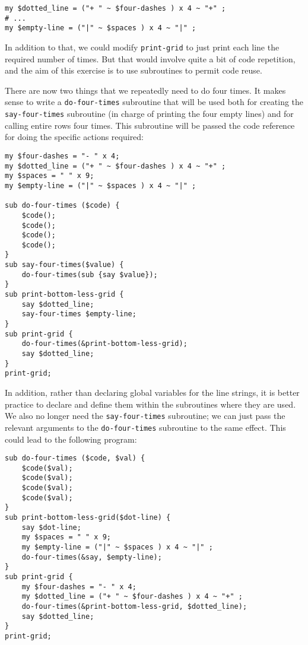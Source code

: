\begin{verbatim}
my $dotted_line = ("+ " ~ $four-dashes ) x 4 ~ "+" ;
# ...
my $empty-line = ("|" ~ $spaces ) x 4 ~ "|" ;
\end{verbatim}

In addition to that, we could modify {\tt print-grid} to just print 
each line the required number of times. But that would involve 
quite a bit of code repetition, and the aim of this exercise 
is to use subroutines to permit code reuse.

There are now two things that we repeatedly need to do four times. 
It makes sense to write a {\tt do-four-times} subroutine that 
will be used both for creating the {\tt say-four-times} subroutine (in 
charge of printing the four empty lines) and for calling 
entire rows four times. This subroutine will be passed the 
code reference for doing the specific actions required:

\begin{verbatim}
my $four-dashes = "- " x 4;
my $dotted_line = ("+ " ~ $four-dashes ) x 4 ~ "+" ;
my $spaces = " " x 9;
my $empty-line = ("|" ~ $spaces ) x 4 ~ "|" ;

sub do-four-times ($code) {
    $code();
    $code();
    $code();
    $code();
}
sub say-four-times($value) {
    do-four-times(sub {say $value});
}
sub print-bottom-less-grid {
    say $dotted_line;
    say-four-times $empty-line;
}
sub print-grid {
    do-four-times(&print-bottom-less-grid);
    say $dotted_line;
}
print-grid;
\end{verbatim}

In addition, rather than declaring global variables for the 
line strings, it is better practice to declare and define them 
within the subroutines where they are used. We also no longer 
need the {\tt say-four-times} subroutine; we can just 
pass the relevant arguments to the {\tt do-four-times} 
subroutine to the same effect. This could lead to the 
following program:

\begin{verbatim}
sub do-four-times ($code, $val) {
    $code($val);
    $code($val);
    $code($val);
    $code($val);
}
sub print-bottom-less-grid($dot-line) {
    say $dot-line;
    my $spaces = " " x 9;
    my $empty-line = ("|" ~ $spaces ) x 4 ~ "|" ;
    do-four-times(&say, $empty-line);
}
sub print-grid {
    my $four-dashes = "- " x 4;
    my $dotted_line = ("+ " ~ $four-dashes ) x 4 ~ "+" ;
    do-four-times(&print-bottom-less-grid, $dotted_line);
    say $dotted_line;
}
print-grid;
\end{verbatim}


